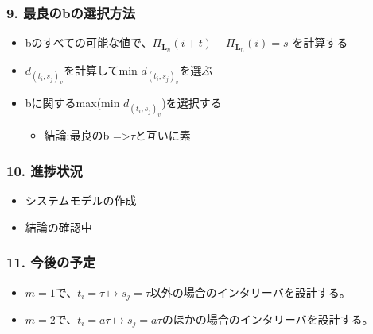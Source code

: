 \documentclass{beamer}  %
\begin{document}
\begin{frame}
\frametitle{9. 最良のbの選択方法}

\begin{itemize}
\setlength\itemsep{2em}
\item bのすべての可能な値で、$\Pi_{\mathbf{L}_n}(i+t)-\Pi_{\mathbf{L}_n}(i)=s$
を計算する

\item $d_{(t_i,s_j)_v}$を計算してmin $d_{(t_i,s_j)_v}$を選ぶ
\item bに関するmax(min $d_{(t_i,s_j)_v}$)を選択する
\begin{itemize}
\setlength\itemsep{1em}
\item 結論:最良のb =>$\tau$と互いに素
\end{itemize}

\end{itemize}

\end{frame}
\begin{frame}
\frametitle{10. 進捗状況}
\begin{itemize}
\setlength \itemsep{2em}
\item システムモデルの作成
\item 結論の確認中
\end{itemize}


\end{frame}


\begin{frame}
\frametitle{11. 今後の予定}
\begin{itemize}
\setlength\itemsep{2em}
\item $m=1$で、$t_i=\tau \mapsto s_j=\tau$以外の場合のインタリーバを設計する。 

\item $m=2$で、$t_i=a\tau \mapsto s_j=a\tau $のほかの場合のインタリーバを設計する。
\end{itemize}


\end{frame}
\end{document}
